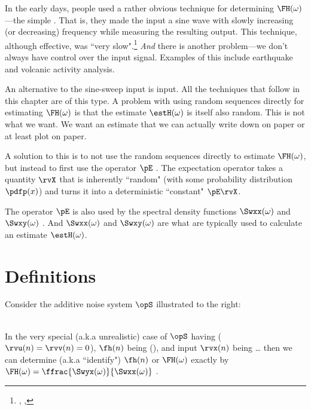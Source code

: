 In the early days, people used a rather obvious technique for determining $\FH(\omega)$---the simple
. That is, they made the input a sine wave with slowly increasing (or decreasing) 
frequency while measuring the resulting output.
This technique, although effective, was ``very slow".\footnote{
  ,
  ,
  }
\emph{And} there is another problem---we don't always have control over the input signal.
Examples of this include earthquake and volcanic activity analysis.

An alternative to the sine-sweep input is  input. 
All the techniques that follow in this chapter are of this type.
A problem with using random sequences directly for estimating $\FH(\omega)$ is that the 
estimate $\estH(\omega)$ is itself also random.
This is not what we want. We want an estimate that we can actually write down 
on paper or at least plot on paper.

A solution to this is to not use the random sequences directly to estimate $\FH(\omega)$, 
but instead to first use the  operator $\pE$ .
The expectation operator takes a quantity $\rvX$ that is inherently ``random" 
(with some probability distribution $\pdfp(x)$) and 
turns it into a deterministic ``constant" $\pE\rvX$.

The operator $\pE$ is also used by the spectral density functions 
$\Swxx(\omega)$ and $\Swxy(\omega)$ .
And $\Swxx(\omega)$ and $\Swxy(\omega)$ are what are typically used to calculate 
an estimate $\estH(\omega)$.

\section{Definitions}
\begin{minipage}{\tw-70mm}
Consider the additive noise system $\opS$ illustrated to the right:
\end{minipage}
\hfill{}
\\
In the very special (a.k.a unrealistic) case of $\opS$ having 
($\rvu(n)=\rvv(n)=0$), 
$\fh(n)$ being  (), 
and input $\rvx(n)$ being \ldots
then we can determine (a.k.a ``identify") $\fh(n)$ or $\FH(\omega)$
exactly by $\FH(\omega)=\ffrac{\Swyx(\omega)}{\Swxx(\omega)}$ .

